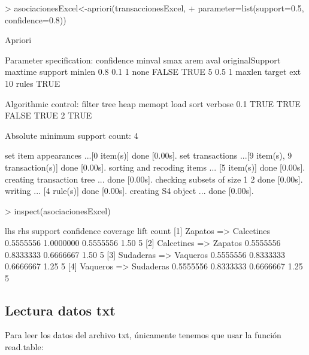 \documentclass [a4paper] {article}
\begin{document}
\begin{Schunk}
\begin{Sinput}
> asociacionesExcel<-apriori(transaccionesExcel, 
+ parameter=list(support=0.5, confidence=0.8))
\end{Sinput}
\begin{Soutput}
Apriori

Parameter specification:
 confidence minval smax arem  aval originalSupport maxtime support minlen
        0.8    0.1    1 none FALSE            TRUE       5     0.5      1
 maxlen target  ext
     10  rules TRUE

Algorithmic control:
 filter tree heap memopt load sort verbose
    0.1 TRUE TRUE  FALSE TRUE    2    TRUE

Absolute minimum support count: 4 

set item appearances ...[0 item(s)] done [0.00s].
set transactions ...[9 item(s), 9 transaction(s)] done [0.00s].
sorting and recoding items ... [5 item(s)] done [0.00s].
creating transaction tree ... done [0.00s].
checking subsets of size 1 2 done [0.00s].
writing ... [4 rule(s)] done [0.00s].
creating S4 object  ... done [0.00s].
\end{Soutput}
\begin{Sinput}
> inspect(asociacionesExcel)
\end{Sinput}
\begin{Soutput}
    lhs             rhs          support   confidence coverage  lift count
[1] {Zapatos}    => {Calcetines} 0.5555556 1.0000000  0.5555556 1.50 5    
[2] {Calcetines} => {Zapatos}    0.5555556 0.8333333  0.6666667 1.50 5    
[3] {Sudaderas}  => {Vaqueros}   0.5555556 0.8333333  0.6666667 1.25 5    
[4] {Vaqueros}   => {Sudaderas}  0.5555556 0.8333333  0.6666667 1.25 5    
\end{Soutput}
\end{Schunk}

\subsection{Lectura datos txt}
Para leer los datos del archivo txt, únicamente tenemos que usar la función read.table:
\end{document}
